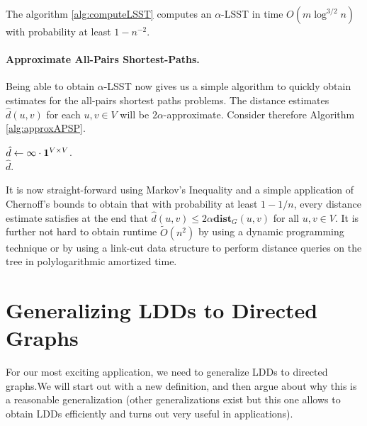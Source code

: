 \begin{theorem}
The algorithm \ref{alg:computeLSST} computes an $\alpha$-LSST in time $O(m \log^{3/2} n)$ with probability at least $1-n^{-2}$. 
\end{theorem}

\paragraph{Approximate All-Pairs Shortest-Paths.} Being able to obtain $\alpha$-LSST now gives us a simple algorithm to quickly obtain estimates for the all-pairs shortest paths problems. The distance estimates $\hat{d}(u,v)$ for each $u,v \in V$ will be $2\alpha$-approximate. Consider therefore Algorithm \ref{alg:approxAPSP}.

\begin{algorithm}
$\hat{d} \gets \infty \cdot \boldsymbol{1}^{V \times V}$.\\
\Return $\hat{d}$.
\caption{$\textsc{ApproxAPSPDistances}(G)$}
\label{alg:approxAPSP}
\end{algorithm}

It is now straight-forward using Markov's Inequality and a simple application of Chernoff's bounds to obtain that with probability at least $1- 1/n$, every distance estimate satisfies at the end that $\hat{d}(u,v) \leq 2\alpha \mathbf{dist}_G(u,v)$ for all $u,v \in V$. It is further not hard to obtain runtime $\tilde{O}(n^2)$ by using a dynamic programming technique or by using a link-cut data structure to perform distance queries on the tree in polylogarithmic amortized time.

\section{Generalizing LDDs to Directed Graphs}

For our most exciting application, we need to generalize LDDs to directed graphs.We will start out with a new definition, and then argue about why this is a reasonable generalization (other generalizations exist but this one allows to obtain LDDs efficiently and turns out very useful in applications).

